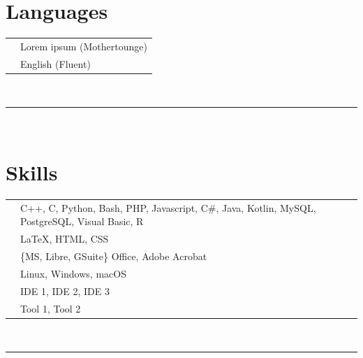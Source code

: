 \documentclass[oneside]{article}
\begin{document}
{{\begin{minipage}[t][\dimexpr\textheight-2\fboxsep-2\fboxrule\relax][t]{\dimexpr0.35\textwidth-2\fboxrule-2\fboxsep\relax}
        \section*{\large Languages}
        \begin{tabularx}{\textwidth}{cY}
            \faLanguage{} & Lorem ipsum (Mothertounge)\\
            \faLanguage{} & English (Fluent)
        \end{tabularx}
        \vspace{.3cm}
        \\
        \rule{\linewidth}{0.4pt}
        \\
        \section*{\large Skills}
        \begin{tabularx}{\textwidth}{cY}
            \faCode{}        & C++, C, Python, Bash, PHP, Javascript, C\#, Java, Kotlin, MySQL, PostgreSQL, Visual Basic, R \\
            \faPen*{}        & \LaTeX, HTML, CSS \\
            \faFont{}        & \{MS, Libre, GSuite\} Office, Adobe Acrobat \\
            \faCogs{}        & Linux, Windows, macOS \\
            \faLaptopCode{}  & IDE 1, IDE 2, IDE 3 \\
            \faToolbox{}     & Tool 1, Tool 2 
        \end{tabularx}
        \vspace{1pt} \\
        \rule{\linewidth}{0.4pt}
        \\


\end{minipage}}}
\end{document}
